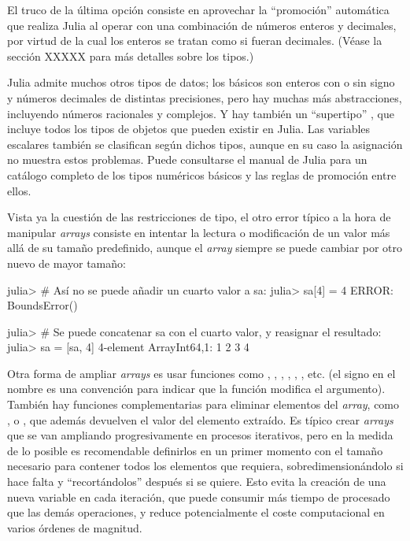 El truco de la última opción consiste en aprovechar la ``promoción'' automática que realiza Julia al operar con una combinación de números enteros y decimales, por virtud de la cual los enteros se tratan como si fueran decimales. (Véase la sección XXXXX para más detalles sobre los tipos.)

Julia admite muchos otros tipos de datos; los básicos son enteros con o sin signo y números decimales de distintas precisiones, pero hay muchas más abstracciones, incluyendo números racionales y complejos. Y hay también un ``supertipo'' , que incluye todos los tipos de objetos que pueden existir en Julia. Las variables escalares también se clasifican según dichos tipos, aunque en su caso la asignación no muestra estos problemas. Puede consultarse el manual de Julia para un catálogo completo de los tipos numéricos básicos y las reglas de promoción entre ellos.

Vista ya la cuestión de las restricciones de tipo, el otro error típico a la hora de manipular \emph{arrays} consiste en intentar la lectura o modificación de un valor más allá de su tamaño predefinido, aunque el \emph{array} siempre se puede cambiar por otro nuevo de mayor tamaño:

\begin{jlconcode}
julia> # Así no se puede añadir un cuarto valor a sa:
julia> sa[4] = 4
ERROR: BoundsError()

julia> # Se puede concatenar sa con el cuarto valor, y reasignar el resultado:
julia> sa = [sa, 4]
4-element Array{Int64,1}:
 1 
 2 
 3 
 4
\end{jlconcode}

Otra forma de ampliar \emph{arrays} es usar funciones como , , , , , , etc. (el signo \jl{!} en el nombre es una convención para indicar que la función modifica el argumento). También hay funciones complementarias para eliminar elementos del \emph{array}, como ,  o , que además devuelven el valor del elemento extraído. Es típico crear \emph{arrays} que se van ampliando progresivamente en procesos iterativos, pero en la medida de lo posible es recomendable definirlos en un primer momento con el tamaño necesario para contener todos los elementos que requiera, sobredimensionándolo si hace falta y ``recortándolos'' después si se quiere. Esto evita la creación de una nueva variable en cada iteración, que puede consumir más tiempo de procesado que las demás operaciones, y reduce potencialmente el coste computacional en varios órdenes de magnitud.

